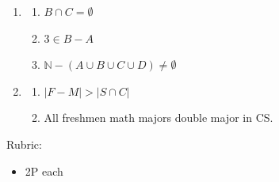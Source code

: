 \documentclass{article}
\newcommand{\N}{\mathbb{N}}
\theoremstyle{definition}
\begin{document}
\begin{solution}
\begin{enumerate}
\item 
    \begin{enumerate}
    \item $B\cap C = \emptyset$
    \item $3\in B- A$
    \item $\N -(A\cup B\cup C\cup D) \neq \emptyset$
    \end{enumerate}
\item 
    \begin{enumerate}
    \item $|F - M| > |S\cap C|$
    \item All freshmen math majors double major in CS.
    \end{enumerate}
\end{enumerate}
{\color{red} Rubric:
\begin{itemize}
\item 2P each
\end{itemize}}
\end{solution}
\end{document}
